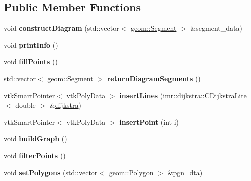 \subsection*{Public Member Functions}
\begin{DoxyCompactItemize}
\item 
void {\bfseries construct\+Diagram} (std\+::vector$<$ \hyperlink{classgeom_1_1Segment}{geom\+::\+Segment} $>$ \&segment\+\_\+data)\hypertarget{classvor_1_1Voro_a074fe9c38f514359398cfc81cd8cfabc}{}\label{classvor_1_1Voro_a074fe9c38f514359398cfc81cd8cfabc}

\item 
void {\bfseries print\+Info} ()\hypertarget{classvor_1_1Voro_acbbbb568eec5b851d88547c2f3841126}{}\label{classvor_1_1Voro_acbbbb568eec5b851d88547c2f3841126}

\item 
void {\bfseries fill\+Points} ()\hypertarget{classvor_1_1Voro_a8f17f536683ae1badcc545f88c4e928c}{}\label{classvor_1_1Voro_a8f17f536683ae1badcc545f88c4e928c}

\item 
std\+::vector$<$ \hyperlink{classgeom_1_1Segment}{geom\+::\+Segment} $>$ {\bfseries return\+Diagram\+Segments} ()\hypertarget{classvor_1_1Voro_ab25bda5c065b267275276f1c770cf5bc}{}\label{classvor_1_1Voro_ab25bda5c065b267275276f1c770cf5bc}

\item 
vtk\+Smart\+Pointer$<$ vtk\+Poly\+Data $>$ {\bfseries insert\+Lines} (\hyperlink{classimr_1_1dijkstra_1_1CDijkstraLite}{imr\+::dijkstra\+::\+C\+Dijkstra\+Lite}$<$ double $>$ \&\hyperlink{graph_8cpp_a7f0876063956a2c9f083434f30d8abd3}{dijkstra})\hypertarget{classvor_1_1Voro_ac6e047f672ae6a226955518106acc9ec}{}\label{classvor_1_1Voro_ac6e047f672ae6a226955518106acc9ec}

\item 
vtk\+Smart\+Pointer$<$ vtk\+Poly\+Data $>$ {\bfseries insert\+Point} (int i)\hypertarget{classvor_1_1Voro_a47ef14bb282788a5fdd25cf2156a41a0}{}\label{classvor_1_1Voro_a47ef14bb282788a5fdd25cf2156a41a0}

\item 
void {\bfseries build\+Graph} ()\hypertarget{classvor_1_1Voro_afdeee1563790b982d0eceeda57ea7621}{}\label{classvor_1_1Voro_afdeee1563790b982d0eceeda57ea7621}

\item 
void {\bfseries filter\+Points} ()\hypertarget{classvor_1_1Voro_ae18a8021c5715e5238a3b4a0f5c1739f}{}\label{classvor_1_1Voro_ae18a8021c5715e5238a3b4a0f5c1739f}

\item 
void {\bfseries set\+Polygons} (std\+::vector$<$ \hyperlink{classgeom_1_1Polygon}{geom\+::\+Polygon} $>$ \&pgn\+\_\+dta)\hypertarget{classvor_1_1Voro_a97b7ef5ee821e3d7876d73f61826001c}{}\label{classvor_1_1Voro_a97b7ef5ee821e3d7876d73f61826001c}

\end{DoxyCompactItemize}
